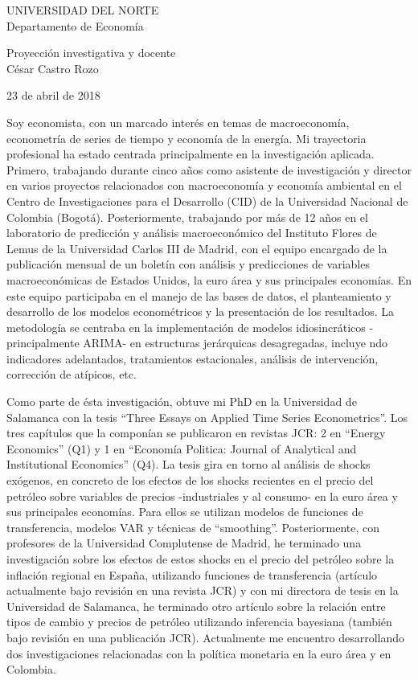 \documentclass{article}\usepackage[]{graphicx}\usepackage[]{color}
\begin{document}
UNIVERSIDAD DEL NORTE\\
Departamento de Economía
\vspace{10pt}

Proyección investigativa y docente\\
César Castro Rozo
\vspace{10pt}

23 de abril de 2018
\vspace{10pt}

Soy economista, con un marcado interés en temas de macroeconomía, econometría de series de tiempo y economía de la energía. Mi trayectoria profesional ha estado centrada principalmente en la investigación aplicada. Primero, trabajando durante cinco años como asistente de investigación y director en varios proyectos relacionados con macroeconomía y economía ambiental en el Centro de Investigaciones para el Desarrollo (CID) de la Universidad Nacional de Colombia (Bogotá). Posteriormente, trabajando por más de 12 años en el laboratorio de predicción y análisis macroeconómico del Instituto Flores de Lemus de la Universidad Carlos III de Madrid, con el equipo encargado de la publicación mensual de un boletín con análisis y predicciones de variables macroeconómicas de Estados Unidos, la euro área y sus principales economías. En este equipo participaba en el manejo de las bases de datos, el planteamiento y desarrollo de los modelos econométricos y la presentación de los resultados. La metodología se centraba en la implementación de modelos idiosincráticos -principalmente ARIMA- en estructuras jerárquicas desagregadas, incluye ndo indicadores adelantados, tratamientos estacionales, análisis de intervención, corrección de atípicos, etc.

Como parte de ésta investigación, obtuve mi PhD en la Universidad de Salamanca con la tesis ``Three Essays on Applied Time Series Econometrics''. Los tres capítulos que la componían se publicaron en revistas JCR: 2 en ``Energy Economics'' (Q1) y 1 en ``Economía Politica: Journal of Analytical and Institutional Economics'' (Q4). La tesis gira en torno al análisis de shocks exógenos, en concreto de los efectos de los shocks recientes en el precio del petróleo sobre variables de precios -industriales y al consumo- en la euro área y sus principales economías. Para ellos se utilizan modelos de funciones de transferencia, modelos VAR y técnicas de ``smoothing''. Posteriormente, con profesores de la Universidad Complutense de Madrid, he terminado una investigación sobre los efectos de estos shocks en el precio del petróleo sobre la inflación regional en España, utilizando funciones de transferencia (artículo actualmente bajo revisión en una revista JCR) y con mi directora de tesis en la Universidad de Salamanca, he terminado otro artículo sobre la relación entre tipos de cambio y precios de petróleo utilizando inferencia bayesiana (también bajo revisión en una publicación JCR). Actualmente me encuentro desarrollando dos investigaciones relacionadas con la política monetaria en la euro área y en Colombia.
\end{document}
